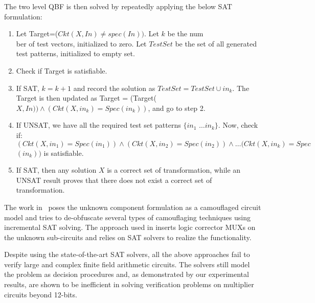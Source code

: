 The two level QBF is then solved by repeatedly applying the below SAT formulation:
  
\begin{enumerate}
	\item Let Target=($Ckt(X,In)\neq spec(In))$. Let $k$ be the num\\ber of test vectors, initialized to zero. Let $TestSet$ be the set of all generated test patterns, initialized to empty set.
	\item Check if Target is satisfiable.
	\item If SAT, $k=k+1$ and record the solution as $TestSet = TestSet \cup in_k$. The Target is then updated as Target = (Target($X,In))\land(Ckt(X,in_k)=Spec(in_k))$, and go to step 2.
    \item If UNSAT, we have all the required test set patterns $\{in_1$ $\dots in_k\}$. Now, check if: $(Ckt(X,in_1) = Spec(in_1)) \land (Ckt(X,in_2) = Spec(in_2)) \land \dots (Ckt(X,in_k) = Spec$ $(in_k))$ is satisfiable.
    \item If SAT, then any solution $X$ is a correct set of transformation, while an UNSAT result proves that there does not exist a correct set of transformation.
\end{enumerate}

The work in~\cite{maciej:2017} poses the unknown component formulation as a camouflaged circuit model and tries to de-obfuscate several types of camouflaging techniques using incremental SAT solving. The approach used in \cite{andreas:2005} inserts logic corrector MUXs on the unknown sub-circuits and relies on SAT solvers to realize the functionality. 

Despite using the state-of-the-art SAT solvers, all the above approaches fail to verify large and complex finite field arithmetic circuits. The solvers still model the problem as decision procedures and, as demonstrated by our experimental results, are shown to be inefficient in solving verification problems on multiplier circuits beyond 12-bits. 

